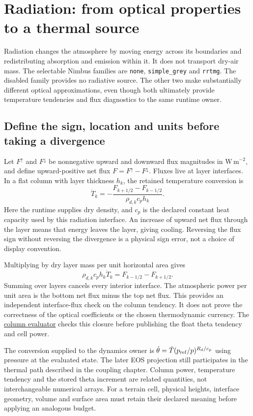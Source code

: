 \chapter{Radiation: from optical properties to a thermal source}\label{radiation-theory}

Radiation changes the atmosphere by moving energy across its boundaries and
redistributing absorption and emission within it. It does not transport dry-air
mass. The selectable Nimbus families are \texttt{none}, \texttt{simple\_grey}
and \texttt{rrtmg}. The disabled family provides no radiative source. The other
two make substantially different optical approximations, even though both
ultimately provide temperature tendencies and flux diagnostics to the same
runtime owner.

\section{Define the sign, location and units before taking a divergence}

Let $F^\uparrow$ and $F^\downarrow$ be nonnegative upward and downward flux
magnitudes in $\mathrm{W\,m^{-2}}$, and define upward-positive net flux
$F=F^\uparrow-F^\downarrow$. Fluxes live at layer interfaces. In a flat column
with layer thickness $h_k$, the retained temperature conversion is
\[
 \dot T_k=-\frac{F_{k+1/2}-F_{k-1/2}}{\rho_{d,k}c_p h_k}.
\]
Here the runtime supplies dry density, and $c_p$ is the declared constant heat
capacity used by this radiation interface. An increase of upward net flux
through the layer means that energy leaves the layer, giving cooling. Reversing
the flux sign without reversing the divergence is a physical sign error, not
a choice of display convention.

Multiplying by dry layer mass per unit horizontal area gives
\[
 \rho_{d,k}c_p h_k\dot T_k=F_{k-1/2}-F_{k+1/2}.
\]
Summing over layers cancels every interior interface. The atmospheric power per
unit area is the bottom net flux minus the top net flux. This provides an
independent interface-flux check on the column tendency. It does not prove the
correctness of the optical coefficients or the chosen thermodynamic currency.
The \href{../src/radiation/column_evaluation.cpp}{column evaluator} checks this
closure before publishing the float theta tendency and cell power.



The conversion supplied to the dynamics owner is
$\dot\theta=\dot T(p_{\rm ref}/p)^{R_d/c_p}$ using pressure at the evaluated
state. The later EOS projection still participates in the thermal path described
in the coupling chapter. Column power, temperature tendency and the stored
theta increment are related quantities, not interchangeable numerical arrays.
For a terrain cell, physical heights, interface geometry, volume and surface
area must retain their declared meaning before applying an analogous budget.

